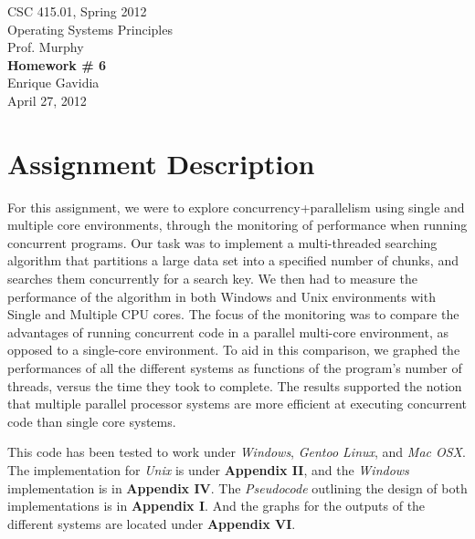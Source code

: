 \documentclass[12pt]{article}
\def \name       {Enrique Gavidia}
\def \coursenum  {CSC 415.01}
\def \coursename {Operating Systems Principles}
\def \instructor {Prof. Murphy}
\def \semester   {Spring 2012}
\def \assignment {Homework \# 6}
\def \duedate    {April 27, 2012}
\newcommand {\makecover} {
  \begin{titlepage}
    \begin{center}
      \LARGE{\coursenum, \semester \\ \coursename}\\
      \Large{\instructor}\\
      \vfill
      \textbf{\Huge \assignment}\\
      \vfill
      \Large{\name}\\
      \large{\duedate}
    \end{center}
  \end{titlepage}
}
\begin{document}
\makecover

\section*{Assignment Description}
For this assignment, we were to explore concurrency+parallelism using single and multiple core environments, through the monitoring 
of performance when running concurrent programs. Our task was to implement a multi-threaded searching algorithm that partitions a
large data set into a specified number of chunks, and searches them concurrently for a search key.  We then had to measure the performance
of the algorithm in both Windows and Unix environments with Single and Multiple CPU cores.  The focus of the monitoring was to compare
the advantages of running concurrent code in a parallel multi-core environment, as opposed to a single-core environment. To aid in this
comparison, we graphed the performances of all the different systems as functions of the program's number of threads, versus the time
they took to complete. The results supported the notion that multiple parallel processor systems are more efficient at executing concurrent 
code than single core systems.

 
This code has been tested to work under \textsl{Windows}, \textsl{Gentoo Linux}, and \textsl{Mac OSX}.
The implementation for \textsl{Unix} is under \textbf{Appendix II}, and the \textsl{Windows} implementation is in \textbf{Appendix IV}. 
The \textsl{Pseudocode} outlining the design of both implementations is in \textbf{Appendix I}.
And the graphs for the outputs of the different systems are located under \textbf{Appendix VI}.
\end{document}
